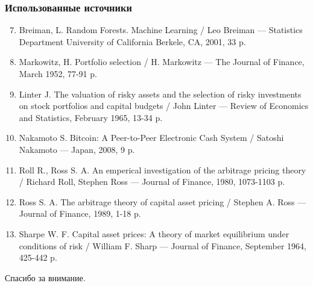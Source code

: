 \documentclass{beamer}
\begin{document}
\begin{frame}
    \frametitle{Использованные источники}
    \begin{enumerate}
        \setcounter{enumi}{6}
        \item 
        Breiman, L. Random Forests. Machine Learning / Leo Breiman --- 
        Statistics Department University of California Berkele, CA, 2001, 33 p.
        
        \item 
        Markowitz, H. Portfolio selection / 
        H. Markowitz --- The Journal of Finance, March 1952, 77-91 p.

        \item 
        Linter J. The valuation of risky assets and the selection of risky investments on stock portfolios and capital budgets /
        John Linter --- Review of Economics and Statistics, February 1965, 13-34 p.

        \item 
        Nakamoto S. Bitcoin: A Peer-to-Peer Electronic Cash System / 
        Satoshi Nakamoto --- Japan, 2008, 9 p.
        
        \item 
        Roll R., Ross S. A. An emperical investigation of the arbitrage pricing theory /
        Richard Roll, Stephen Ross --- Journal of Finance, 1980, 1073-1103 p.

        \item 
        Ross S. A. The arbitrage theory of capital asset pricing /
        Stephen A. Ross --- Journal of Finance, 1989, 1-18 p.
        
        \item 
        Sharpe W. F. Capital asset prices: A theory of market equilibrium under conditions of risk /
        William F. Sharp --- Journal of Finance, September 1964, 425-442 p.
    \end{enumerate}
\end{frame}

\begin{frame}
    \centering
    Спасибо за внимание.
\end{frame}
\end{document}
